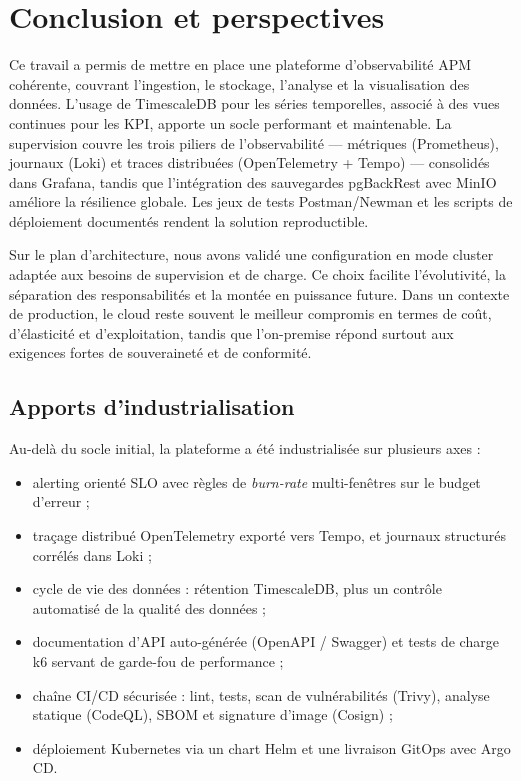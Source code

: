 \section{Conclusion et perspectives}

Ce travail a permis de mettre en place une plateforme d’observabilité APM cohérente, couvrant l’ingestion, le stockage, l’analyse et la visualisation des données. L’usage de TimescaleDB pour les séries temporelles, associé à des vues continues pour les KPI, apporte un socle performant et maintenable. La supervision couvre les trois piliers de l’observabilité --- métriques (Prometheus), journaux (Loki) et traces distribuées (OpenTelemetry + Tempo) --- consolidés dans Grafana, tandis que l’intégration des sauvegardes pgBackRest avec MinIO améliore la résilience globale. Les jeux de tests Postman/Newman et les scripts de déploiement documentés rendent la solution reproductible.

Sur le plan d’architecture, nous avons validé une configuration en mode cluster adaptée aux besoins de supervision et de charge. Ce choix facilite l’évolutivité, la séparation des responsabilités et la montée en puissance future. Dans un contexte de production, le cloud reste souvent le meilleur compromis en termes de coût, d’élasticité et d’exploitation, tandis que l’on-premise répond surtout aux exigences fortes de souveraineté et de conformité.

\subsection*{Apports d'industrialisation}
Au-delà du socle initial, la plateforme a été industrialisée sur plusieurs axes :
\begin{itemize}
    \item alerting orienté SLO avec règles de \emph{burn-rate} multi-fenêtres sur le budget d’erreur ;
    \item traçage distribué OpenTelemetry exporté vers Tempo, et journaux structurés corrélés dans Loki ;
    \item cycle de vie des données : rétention TimescaleDB, plus un contrôle automatisé de la qualité des données ;
    \item documentation d’API auto-générée (OpenAPI / Swagger) et tests de charge k6 servant de garde-fou de performance ;
    \item chaîne CI/CD sécurisée : lint, tests, scan de vulnérabilités (Trivy), analyse statique (CodeQL), SBOM et signature d’image (Cosign) ;
    \item déploiement Kubernetes via un chart Helm et une livraison GitOps avec Argo CD.
\end{itemize}


